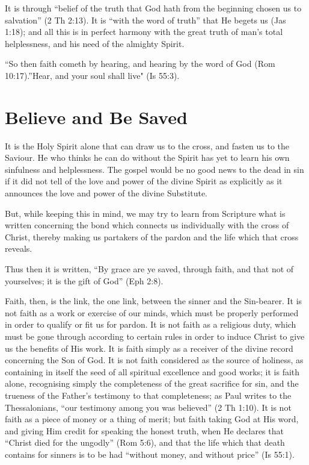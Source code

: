 \documentclass[
]{book}
\begin{document}
It is through ``belief of the truth that God hath from the beginning chosen us to salvation'' (2 Th 2:13). It is ``with the word of truth'' that He begets us (Jas 1:18); and all this is in perfect harmony with the great truth of man's total helplessness, and his need of the almighty Spirit.

``So then faith cometh by hearing, and hearing by the word of God (Rom 10:17).''Hear, and your soul shall live" (Is 55:3).

\hypertarget{believe-and-be-saved}{%
\chapter{Believe and Be Saved}\label{believe-and-be-saved}}

It is the Holy Spirit alone that can draw us to the cross, and fasten us to the Saviour. He who thinks he can do without the Spirit has yet to learn his own sinfulness and helplessness. The gospel would be no good news to the dead in sin if it did not tell of the love and power of the divine Spirit as explicitly as it announces the love and power of the divine Substitute.

But, while keeping this in mind, we may try to learn from Scripture what is written concerning the bond which connects us individually with the cross of Christ, thereby making us partakers of the pardon and the life which that cross reveals.

Thus then it is written, ``By grace are ye saved, through faith, and that not of yourselves; it is the gift of God'' (Eph 2:8).

Faith, then, is the link, the one link, between the sinner and the Sin-bearer. It is not faith as a work or exercise of our minds, which must be properly performed in order to qualify or fit us for pardon. It is not faith as a religious duty, which must be gone through according to certain rules in order to induce Christ to give us the benefits of His work. It is faith simply as a receiver of the divine record concerning the Son of God. It is not faith considered as the source of holiness, as containing in itself the seed of all spiritual excellence and good works; it is faith alone, recognising simply the completeness of the great sacrifice for sin, and the trueness of the Father's testimony to that completeness; as Paul writes to the Thessalonians, ``our testimony among you was believed'' (2 Th 1:10). It is not faith as a piece of money or a thing of merit; but faith taking God at His word, and giving Him credit for speaking the honest truth, when He declares that ``Christ died for the ungodly'' (Rom 5:6), and that the life which that death contains for sinners is to be had ``without money, and without price'' (Is 55:1).
\end{document}
